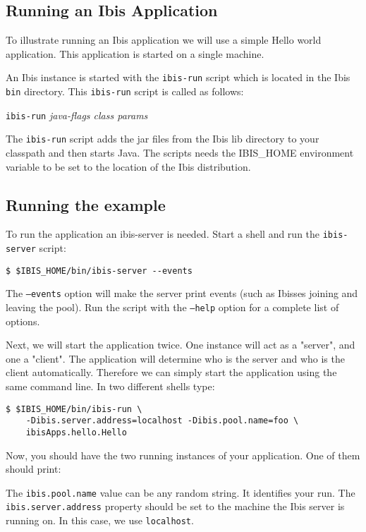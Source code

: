 \documentclass[10pt]{article}
\newcommand{\mysubsection}[1]{\subsection{#1}\label{#1}}
\begin{document}
\mysubsection{Running an Ibis Application}

To illustrate running an Ibis application we will use a simple Hello
world application. This application is started on a single machine.

An Ibis instance is started with the \texttt{ibis-run} script which
is located in the Ibis \texttt{bin} directory.  This \texttt{ibis-run}
script is called as follows:
\begin{center}
\texttt{ibis-run} \emph{java-flags class params}
\end{center}

The \texttt{ibis-run} script adds the jar files
from the Ibis lib directory to your classpath and then starts Java. The
scripts needs the IBIS\_HOME environment variable to be set to the
location of the Ibis distribution.

\mysubsection{Running the example}
To run the application an ibis-server is needed. Start a shell and
run the \texttt{ibis-server} script:
\noindent
{\small
\begin{verbatim}
$ $IBIS_HOME/bin/ibis-server --events
\end{verbatim}
}
\noindent

The \texttt{--events} option will make the server print events (such as
Ibisses joining and leaving the pool). Run the script with the
\texttt{--help} option for a complete list of options.

Next, we will start the application twice. One instance will act as a  
"server", and one a "client". The application will determine who is
the server and who is the client automatically. Therefore we can simply start the application using
the same command line. In two different shells type:

\noindent
{\small
\begin{verbatim}
$ $IBIS_HOME/bin/ibis-run \
    -Dibis.server.address=localhost -Dibis.pool.name=foo \
    ibisApps.hello.Hello
\end{verbatim}
}
\noindent
Now, you should have the two running instances of your application. One of them should print:

 \noindent 

The \texttt{ibis.pool.name} value can be any random string.  It
identifies your run. The \texttt{ibis.server.address} property should be
set to the machine the Ibis server is running on. In this case, we use
\texttt{localhost}.
\end{document}
